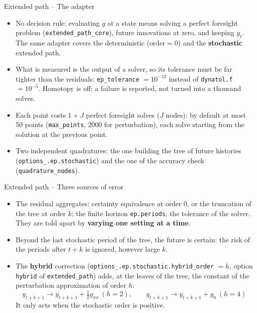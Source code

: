 \documentclass[11pt,aspectratio=169]{beamer}
\newcommand{\code}[1]{\texttt{#1}}
\begin{document}
\begin{frame}{Extended path -- The adapter}

\begin{itemize}

\item No decision rule: evaluating $g$ at a state means solving a perfect foresight problem (\code{extended\_path\_core}), future innovations at zero, and keeping $y_t$. The same adapter covers the deterministic ($\text{order}=0$) and the \textbf{stochastic} extended path.\newline

\item What is measured is the output of a solver, so its tolerance must be far tighter than the residuals: \code{ep\_tolerance} $=10^{-12}$ instead of \code{dynatol.f} $=10^{-5}$. Homotopy is off: a failure is reported, not turned into a thousand solves.\newline

\item Each point costs $1+J$ perfect foresight solves ($J$ nodes): by default at most 50 points (\code{max\_points}, 2000 for perturbation), each solve starting from the solution at the previous point.\newline

\item Two independent quadratures: the one building the tree of future histories (\code{options\_.ep.stochastic}) and the one of the accuracy check (\code{quadrature\_nodes}).

\end{itemize}

\end{frame}

\begin{frame}{Extended path -- Three sources of error}

\begin{itemize}

\item The residual aggregates: certainty equivalence at order 0, or the truncation of the tree at order $k$; the finite horizon \code{ep.periods}; the tolerance of the solver. They are told apart by \textbf{varying one setting at a time}.\newline

\item Beyond the last stochastic period of the tree, the future is certain: the risk of the periods after $t+k$ is ignored, however large $k$.\newline

\item The \textbf{hybrid} correction (\code{options\_.ep.stochastic.hybrid\_order} $=h$, option \code{hybrid} of \code{extended\_path}) adds, at the leaves of the tree, the constant of the perturbation approximation of order $h$:
  \[
  y_{t+k+1} \to y_{t+k+1} + \tfrac12 g_{\sigma\sigma}\ (h=2),\qquad y_{t+k+1} \to y_{t+k+1} + g_0\ (h=4)
  \]
  It only acts when the stochastic order is positive.

\end{itemize}

\end{frame}
\end{document}
